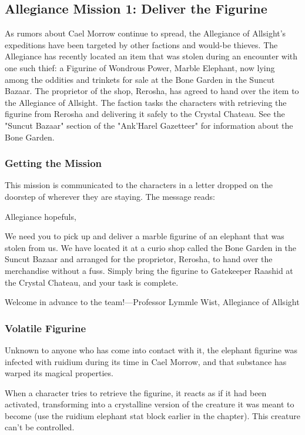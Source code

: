 \documentclass[10pt,a4paper,twoside,twocolumn,openany,nodeprecatedcode]{dndbook}
\begin{document}
\subsection{Allegiance Mission 1: Deliver the Figurine}
As rumors about Cael Morrow continue to spread, the Allegiance of Allsight's expeditions have been targeted by other factions and would-be thieves. The Allegiance has recently located an item that was stolen during an encounter with one such thief: a Figurine of Wondrous Power, Marble Elephant, now lying among the oddities and trinkets for sale at the Bone Garden in the Suncut Bazaar. The proprietor of the shop, Rerosha, has agreed to hand over the item to the Allegiance of Allsight. The faction tasks the characters with retrieving the figurine from Rerosha and delivering it safely to the Crystal Chateau. See the "Suncut Bazaar" section of the "Ank'Harel Gazetteer" for information about the Bone Garden.

\subsubsection{Getting the Mission}
This mission is communicated to the characters in a letter dropped on the doorstep of wherever they are staying. The message reads:

\begin{DndReadAloud}{}
Allegiance hopefuls,

We need you to pick up and deliver a marble figurine of an elephant that was stolen from us. We have located it at a curio shop called the Bone Garden in the Suncut Bazaar and arranged for the proprietor, Rerosha, to hand over the merchandise without a fuss. Simply bring the figurine to Gatekeeper Raashid at the Crystal Chateau, and your task is complete.

Welcome in advance to the team!—Professor Lymmle Wist, Allegiance of Allsight

\end{DndReadAloud}

\subsubsection{Volatile Figurine}
Unknown to anyone who has come into contact with it, the elephant figurine was infected with ruidium during its time in Cael Morrow, and that substance has warped its magical properties.

When a character tries to retrieve the figurine, it reacts as if it had been activated, transforming into a crystalline version of the creature it was meant to become (use the ruidium elephant stat block earlier in the chapter). This creature can't be controlled.
\end{document}
